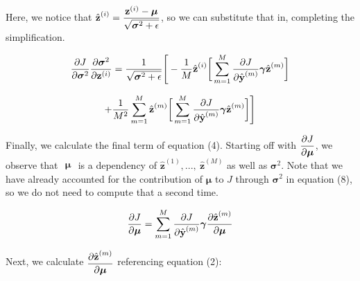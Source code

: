 \documentclass{article}
\begin{document}
\begin{multicols}{2}
Here, we notice that $\begin{aligned}
    \hat{\textbf{z}}^{(i)} = {\textbf{z}^{(i)} - \boldsymbol{\mu} \over \sqrt{\boldsymbol{\sigma}^2 + \epsilon}}
\end{aligned}$, so we can substitute that in, completing the simplification.

$$\begin{aligned}
    {\partial J \over \partial \boldsymbol{\sigma}^2} 
    {\partial \boldsymbol{\sigma}^2 \over \partial \textbf{z}^{(i)}}
    = {1 \over \sqrt{\boldsymbol{\sigma}^2 + \epsilon}}\Bigg[-{1 \over M} \hat{\textbf{z}}^{(i)} \bigg[
        \sum_{m = 1}^M {\partial J \over \partial \hat{\textbf{y}}^{(m)}} 
        \boldsymbol{\gamma}
        \hat{\textbf{z}}^{(m)} \bigg]
\end{aligned}$$

\begin{equation}
    +{1 \over M^2} \sum_{m=1}^M \hat{\textbf{z}}^{(m)}
        \bigg[
        \sum_{m = 1}^M {\partial J \over \partial \hat{\textbf{y}}^{(m)}} 
        \boldsymbol{\gamma}
        \hat{\textbf{z}}^{(m)}\bigg]\Bigg]
\end{equation}

Finally, we calculate the final term of equation (4). Starting off
with $\begin{aligned}
    {\partial J \over \partial \boldsymbol{\mu}}
\end{aligned}$, we observe that $\begin{aligned}
    \boldsymbol{\mu} 
\end{aligned}$ is a dependency of $\hat{\textbf{z}}^{(1)},...,\ \hat{\textbf{z}}^{(M)}$
as well as $\boldsymbol{\sigma}^2$. Note that we have already accounted for
the contribution of $\boldsymbol{\mu}$ to $J$ through $\boldsymbol{\sigma}^2$
in equation (8), so we do not need to compute that a second time.

\begin{equation}
    {\partial J \over \partial \boldsymbol{\mu}} = 
    \sum_{m=1}^M {\partial J \over \partial \hat{\textbf{y}}^{(m)}}
    \boldsymbol{\gamma}
    {\partial \hat{\textbf{z}}^{(m)} \over \partial \boldsymbol{\mu}} \notag
\end{equation}

Next, we calculate $\begin{aligned}
    {\partial \hat{\textbf{z}}^{(m)} \over \partial \boldsymbol{\mu}} 
\end{aligned}$ referencing equation (2):


\end{multicols}
\end{document}
